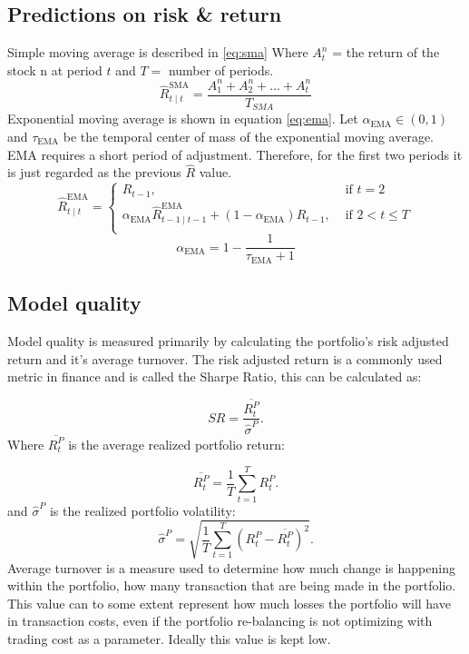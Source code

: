 \documentclass{LTHtwocol} %
\begin{document}
\subsection{Predictions on risk \& return}
Simple moving average is described in \ref{eq:sma} Where $A^n_t$ = the return of the stock n at period $t$ and $T =$ number of periods.
\begin{equation} 
\label{eq:sma}
 \hat{R}_{t \mid t}^{\mathrm{SMA}} = \frac{A^n_1+A^n_2+...+A^n_t}{T_{SMA}}
\end{equation}
Exponential moving average is shown in equation \ref{eq:ema}. Let $\alpha_{\text{EMA}}\in (0,1)$ and $\tau_{\text{EMA}}$ be the temporal center of mass of the exponential moving average. EMA requires a short period of adjustment. Therefore, for the first two periods it is just regarded as the previous $\hat{R}$ value. \cite{ref:ema}
\begin{equation}
    \label{eq:ema}
    \hat{R}_{t \mid t}^{\mathrm{EMA}}=\left\{\begin{array}{ll}
    R_{t-1}, & \text { if } t=2 \\
    \alpha_{\mathrm{EMA}} \hat{R}_{t-1 \mid t-1}^{\mathrm{EMA}}+\left(1-\alpha_{\mathrm{EMA}}\right) R_{t-1}, & \text { if } 2<t \leq T\\
    \end{array}\right. 
\end{equation}
\begin{equation}
     \alpha_{\text{EMA}} = 1 - \frac{1}{\tau_{\text{EMA}} + 1}
\end{equation}



\subsection{Model quality}
Model quality is measured primarily by calculating the portfolio's risk adjusted return and it's average turnover. The risk adjusted return is a commonly used metric in finance and is called the Sharpe Ratio,\cite{ref:sharpe} this can be calculated as:

$$
SR = \frac{\overline{R^{P}_{t}}}{\widehat{\sigma}^{P}}.
$$
Where $\overline{R^{P}_{t}}$ is the average realized portfolio return: 

$$
\overline{R^{P}_{t}} = \frac{1}{T}\sum_{t=1}^{T}R_{t}^{P}.
$$
and $\widehat{\sigma}^{P}$ is the realized portfolio volatility:
$$
\widehat{\sigma}^{P} = \sqrt{\frac{1}{T}\sum_{t=1}^{T}(R_{t}^{P}-\overline{R^{P}_{t}})^{2}}.
$$
Average turnover is a measure used to determine how much change is happening within the portfolio, how many transaction that are being made in the portfolio. This value can to some extent represent how much losses the portfolio will have in transaction costs, even if the portfolio re-balancing is not optimizing with trading cost as a parameter. Ideally this value is kept low.
\end{document}
